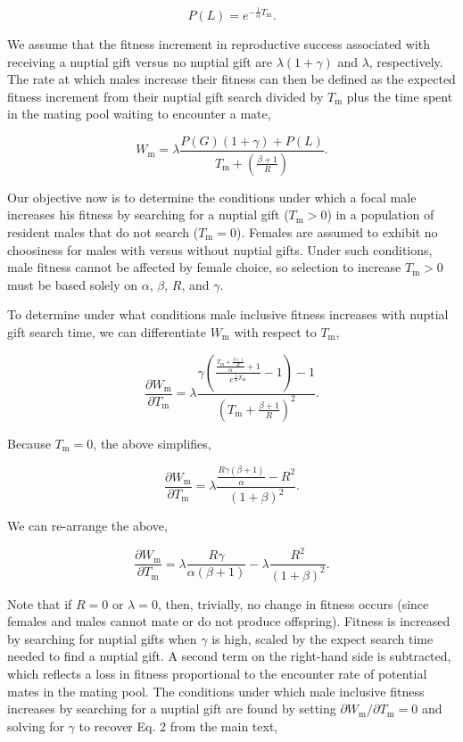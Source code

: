 \documentclass[
]{article}
\begin{document}
\[P(L) = e^{-\frac{1}{\alpha}T_{\mathrm{m}}}.\]

We assume that the fitness increment in reproductive success associated
with receiving a nuptial gift versus no nuptial gift are
\(\lambda(1 + \gamma)\) and \(\lambda\), respectively. The rate at which
males increase their fitness can then be defined as the expected fitness
increment from their nuptial gift search divided by \(T_{\mathrm{m}}\)
plus the time spent in the mating pool waiting to encounter a mate,

\[W_{\mathrm{m}} = \lambda \frac{P(G)\left(1 + \gamma\right) + P(L)}{T_{\mathrm{m}} + \left( \frac{\beta + 1}{R} \right)}.\]

Our objective now is to determine the conditions under which a focal
male increases his fitness by searching for a nuptial gift
(\(T_{\mathrm{m}}>0\)) in a population of resident males that do not
search (\(T_{\mathrm{m}}=0\)). Females are assumed to exhibit no
choosiness for males with versus without nuptial gifts. Under such
conditions, male fitness cannot be affected by female choice, so
selection to increase \(T_{\mathrm{m}}>0\) must be based solely on
\(\alpha\), \(\beta\), \(R\), and \(\gamma\).

To determine under what conditions male inclusive fitness increases with
nuptial gift search time, we can differentiate \(W_{\mathrm{m}}\) with
respect to \(T_{\mathrm{m}}\),

\[\frac{\partial W_{\mathrm{m}}}{\partial T_{\mathrm{m}}} = \lambda\frac{\gamma\left(\frac{\frac{T_{\mathrm{m}} + \frac{\beta + 1}{R}}{\alpha} + 1}{e^{\frac{1}{\alpha}T_{\mathrm{m}}}} - 1\right) - 1}{\left(T_{\mathrm{m}} + \frac{\beta + 1}{R} \right)^{2}}.\]

Because \(T_{\mathrm{m}} = 0\), the above simplifies,

\[\frac{\partial W_{\mathrm{m}}}{\partial T_{\mathrm{m}}} = \lambda \frac{\frac{R\gamma\left(\beta + 1\right)}{\alpha} - R^{2}}{\left(1 + \beta \right)^{2}}.\]

We can re-arrange the above,

\[\frac{\partial W_{\mathrm{m}}}{\partial T_{\mathrm{m}}} = \lambda \frac{R\gamma}{\alpha\left(\beta+1\right)} - \lambda\frac{R^{2}}{{\left(1 + \beta \right)^{2}}}.\]

Note that if \(R = 0\) or \(\lambda = 0\), then, trivially, no change in
fitness occurs (since females and males cannot mate or do not produce
offspring). Fitness is increased by searching for nuptial gifts when
\(\gamma\) is high, scaled by the expect search time needed to find a
nuptial gift. A second term on the right-hand side is subtracted, which
reflects a loss in fitness proportional to the encounter rate of
potential mates in the mating pool. The conditions under which male
inclusive fitness increases by searching for a nuptial gift are found by
setting \(\partial W_{\mathrm{m}}/\partial T_{\mathrm{m}} = 0\) and
solving for \(\gamma\) to recover Eq. 2 from the main text,
\end{document}

